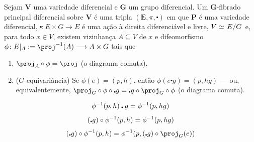 \begin{defi}
Sejam $\bm V$ uma variedade diferencial e $\bm G$ um grupo diferencial. Um $\bm G$-fibrado principal diferencial sobre $\bm V$ é uma tripla $(\bm E,\pi,\centerdot)$ em que $\bm P$ é uma variedade diferencial, $\centerdot\colon E \times G \to E$ é uma ação à direita diferenciável e livre, $V \simeq \quo{E}{G}$ e, para todo $x \in V$, existem vizinhança $A \subseteq V$ de $x$ e difeomorfismo $\phi\colon E|_A := \proj\inv(A) \to A \times G$ tais que
	\begin{enumerate}
	\item $\proj_A \circ \phi = \proj$ (o diagrama comuta).
\begin{figure}
\centering
{}
\end{figure}

	\item ($G$-equivariância) Se $\phi(e) = (p,h)$, então $\phi(e \centerdot g) = (p,hg)$ --- ou, equivalentemente, $\proj_G \circ \phi \circ \centerdot g = \centerdot g \circ \proj_G \circ \phi$ (o diagrama comuta).
\begin{figure}
\centering
{}
\end{figure}
	\end{enumerate}
\end{defi}

	\begin{equation*}
	\phi^{-1} (p,h) \centerdot g = \phi^{-1} (p,hg)
	\end{equation*}
	\begin{equation*}
	(\centerdot g) \circ \phi^{-1} (p,h) = \phi^{-1} (p,hg)
	\end{equation*}
	\begin{equation*}
	(\centerdot g) \circ \phi\inv (p,h) = \phi\inv (p,(\centerdot g) \circ \proj_G(e))
	\end{equation*}

